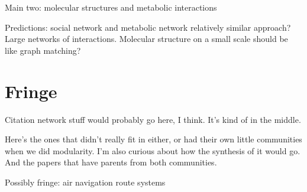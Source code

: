 \documentclass[12pt]{thesis}
\theoremstyle{plain}
\theoremstyle{definition}
\theoremstyle{remark}
\begin{document}
Main two: molecular structures and metabolic interactions

Predictions: social network and metabolic network relatively similar approach? Large networks of interactions. Molecular structure on a small scale should be like graph matching? 

\chapter{Fringe}

Citation network stuff would probably go here, I think. It's kind of in the middle.

Here's the ones that didn't really fit in either, or had their own little communities when we did modularity. I'm also curious about how the synthesis of it would go. And the papers that have parents from both communities.

Possibly fringe: air navigation route systems






\printindex
\end{document}
